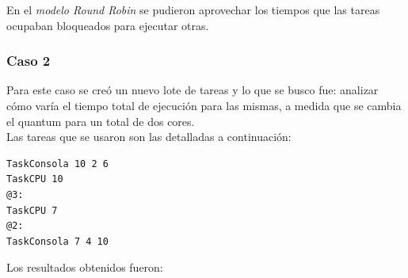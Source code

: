 \documentclass[a4paper]{article}
\begin{document}
 En el \emph{modelo Round Robin} se pudieron aprovechar los tiempos que las tareas ocupaban bloqueados para ejecutar otras.

%
%
%
%
% 
 \bigskip
 
 \newpage
 \subsubsection*{Caso 2}\label{caso2}
 
 Para este caso se cre\'o un nuevo lote de tareas y lo que se busco fue: analizar c\'omo varía el tiempo total de ejecución para las mismas, a medida que se cambia el quantum para un total de dos cores.\\
 
 Las tareas que se usaron son las detalladas a continuaci\'on:\\
 \begin{codesnippet}
	\begin{verbatim}
TaskConsola 10 2 6
TaskCPU 10
@3:
TaskCPU 7
@2:
TaskConsola 7 4 10
	\end{verbatim}
	\end{codesnippet}


Los resultados obtenidos fueron:\\
\end{document}

